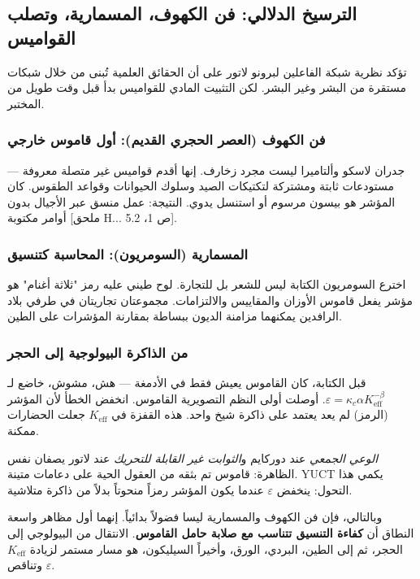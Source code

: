 \documentclass[12pt,a4paper]{article}
\begin{document}
	\subsection{الترسيخ الدلالي: فن الكهوف، المسمارية، وتصلب القواميس}
	\label{subsec:semantic-consolidation}
	
	تؤكد نظرية شبكة الفاعلين لبرونو لاتور على أن الحقائق العلمية تُبنى من خلال شبكات مستقرة من البشر وغير البشر. لكن التثبيت المادي للقواميس بدأ قبل وقت طويل من المختبر.
	
	\subsubsection{فن الكهوف (العصر الحجري القديم): أول قاموس خارجي}
	
	جدران لاسكو وألتاميرا ليست مجرد زخارف. إنها أقدم قواميس غير متصلة معروفة — مستودعات ثابتة ومشتركة لتكتيكات الصيد وسلوك الحيوانات وقواعد الطقوس. كان المؤشر هو بيسون مرسوم أو استنسل يدوي. النتيجة: عمل منسق عبر الأجيال بدون أوامر مكتوبة [ملحق H... ص 1، 5.2].
	
	\subsubsection{المسمارية (السومريون): المحاسبة كتنسيق}
	
	اخترع السومريون الكتابة ليس للشعر بل للتجارة. لوح طيني عليه رمز "ثلاثة أغنام" هو مؤشر يفعل قاموس الأوزان والمقاييس والالتزامات. مجموعتان تجاريتان في طرفي بلاد الرافدين يمكنهما مزامنة الديون ببساطة بمقارنة المؤشرات على الطين.
	
	\subsubsection{من الذاكرة البيولوجية إلى الحجر}
	
	قبل الكتابة، كان القاموس يعيش فقط في الأدمغة — هش، مشوش، خاضع لـ \(\varepsilon = \kappa_c \alpha K_{\mathrm{eff}}^{-\beta}\). أوصلت أولى النظم التصويرية القاموس. انخفض الخطأ لأن المؤشر (الرمز) لم يعد يعتمد على ذاكرة شيخ واحد. هذه القفزة في \(K_{\mathrm{eff}}\) جعلت الحضارات ممكنة.
	
	\emph{الوعي الجمعي} عند دوركايم و\emph{الثوابت غير القابلة للتحريك} عند لاتور يصفان نفس الظاهرة: قاموس تم بثقه من العقول الحية على دعامات متينة. YUCT يكمي هذا التحول: ينخفض \(\varepsilon\) عندما يكون المؤشر رمزاً منحوتاً بدلاً من ذاكرة متلاشية.
	
	وبالتالي، فإن فن الكهوف والمسمارية ليسا فضولاً بدائياً. إنهما أول مظاهر واسعة النطاق أن \textbf{كفاءة التنسيق تتناسب مع صلابة حامل القاموس}. الانتقال من البيولوجي إلى الحجر، ثم إلى الطين، البردي، الورق، وأخيراً السيليكون، هو مسار مستمر لزيادة \(K_{\mathrm{eff}}\) وتناقص \(\varepsilon\).
	
\end{document}
